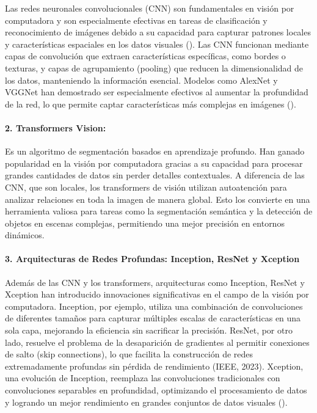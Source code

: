 Las  redes neuronales convolucionales (CNN) son fundamentales en visión por computadora y son especialmente efectivas en tareas de clasificación y reconocimiento de imágenes debido a su capacidad para capturar patrones locales y características espaciales en los datos visuales (\cite{gupta2023cnn}). Las CNN funcionan mediante capas de convolución que extraen características específicas, como bordes o texturas, y capas de agrupamiento (pooling) que reducen la dimensionalidad de los datos, manteniendo la información esencial. Modelos como AlexNet y VGGNet han demostrado ser especialmente efectivos al aumentar la profundidad de la red, lo que permite captar características más complejas en imágenes (\cite{zhang2024deep, ieee2023alexnet}).

\paragraph{2. Transformers Vision:}
Es un algoritmo de segmentación basados en aprendizaje profundo. Han ganado popularidad en la visión por computadora gracias a su capacidad para procesar grandes cantidades de datos sin perder detalles contextuales. A diferencia de las CNN, que son locales, los transformers de visión utilizan autoatención para analizar relaciones en toda la imagen de manera global. Esto los convierte en una herramienta valiosa para tareas como la segmentación semántica y la detección de objetos en escenas complejas, permitiendo una mejor precisión en entornos dinámicos.

\paragraph{3. Arquitecturas de Redes Profundas: Inception, ResNet y Xception}
Además de las CNN y los transformers, arquitecturas como Inception, ResNet y Xception han introducido innovaciones significativas en el campo de la visión por computadora. Inception, por ejemplo, utiliza una combinación de convoluciones de diferentes tamaños para capturar múltiples escalas de características en una sola capa, mejorando la eficiencia sin sacrificar la precisión. ResNet, por otro lado, resuelve el problema de la desaparición de gradientes al permitir conexiones de salto (skip connections), lo que facilita la construcción de redes extremadamente profundas sin pérdida de rendimiento (IEEE, 2023). Xception, una evolución de Inception, reemplaza las convoluciones tradicionales con convoluciones separables en profundidad, optimizando el procesamiento de datos y logrando un mejor rendimiento en grandes conjuntos de datos visuales (\cite{zhang2024deep}).

